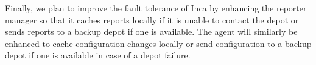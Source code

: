 \documentclass[times,10pt,twocolumn]{article}
\begin{document}
Finally, we plan to improve the fault tolerance of Inca by enhancing the
reporter manager so that it caches reports locally if it is unable to
contact the depot or sends reports to a backup depot if one is available.
The agent will similarly be enhanced to cache configuration changes locally or
send configuration to a backup depot if one is available in case of a depot
failure.


~\newpage



\end{document}
